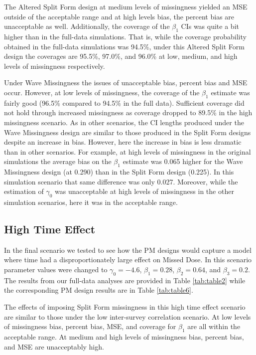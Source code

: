 \documentclass{svjour3}                     %
\begin{document}
The Altered Split Form design at medium levels of missingness yielded an MSE outside of the acceptable range and at high levels bias, the percent bias are unacceptable as well. Additionally, the coverage of the $\beta_1$ CIs was quite a bit higher than in the full-data simulations. That is, while the coverage probability obtained in the full-data simulations was 94.5\%, under this Altered Split Form design the coverages are 95.5\%, 97.0\%, and 96.0\% at low, medium, and high levels of missingness respectively. \par

Under Wave Missingness the issues of unacceptable bias, percent bias and MSE occur. However, at low levels of missingness, the coverage of the $\beta_1$ estimate was fairly good (96.5\% compared to 94.5\% in the full data). Sufficient coverage did not hold through increased missingness as coverage dropped to 89.5\% in the high missingness scenario. As in other scenarios, the CI lengths produced under the Wave Missingness design are similar to those produced in the Split Form designs despite an increase in bias. However, here the increase in bias is less dramatic than in other scenarios. For example, at high levels of missingness in the original simulations the average bias on the $\beta_1$ estimate was 0.065 higher for the Wave Missingness design (at 0.290) than in the Split Form design (0.225). In this simulation scenario that same difference was only 0.027. Moreover, while the estimation of $\gamma_0$ was unacceptable at high levels of missingness in the other simulation scenarios, here it was in the acceptable range.\par


\subsection{High Time Effect}
\label{sec:3.4}
In the final scenario we tested to see how the PM designs would capture a model where time had a disproportionately large effect on Missed Dose. In this scenario parameter values were changed to $\gamma_0 = -4.6$, $\beta_1 = 0.28$, $\beta_2 = 0.64$, and $\beta_3 = 0.2$. The results from our full-data analyses are provided in Table \ref{tab:table2} while the corresponding PM design results are in Table \ref{tab:table6}. \par

The effects of imposing Split Form missingness in this high time effect scenario are similar to those under the low inter-survey correlation scenario. At low levels of missingness bias, percent bias, MSE, and coverage for $\beta_1$ are all within the acceptable range. At medium and high levels of missingness bias, percent bias, and MSE are unacceptably high. \par 
\end{document}
